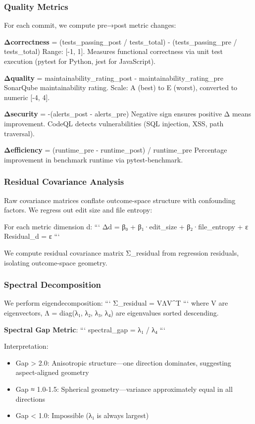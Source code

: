 \subsubsection{Quality Metrics}

For each commit, we compute pre→post metric changes:

\textbf{Δcorrectness} = (tests_passing_post / tests_total) - (tests_passing_pre / tests_total)  
Range: [-1, 1]. Measures functional correctness via unit test execution (pytest for Python, jest for JavaScript).

\textbf{Δquality} = maintainability_rating_post - maintainability_rating_pre  
SonarQube maintainability rating. Scale: A (best) to E (worst), converted to numeric [-4, 4].

\textbf{Δsecurity} = -(alerts_post - alerts_pre)  
Negative sign ensures positive Δ means improvement. CodeQL detects vulnerabilities (SQL injection, XSS, path traversal).

\textbf{Δefficiency} = (runtime_pre - runtime_post) / runtime_pre  
Percentage improvement in benchmark runtime via pytest-benchmark.

\subsubsection{Residual Covariance Analysis}

Raw covariance matrices conflate outcome-space structure with confounding factors. We regress out edit size and file entropy:

For each metric dimension d:
```
Δd = β₀ + β₁·edit_size + β₂·file_entropy + ε
Residual_d = ε
```

We compute residual covariance matrix Σ_residual from regression residuals, isolating outcome-space geometry.

\subsubsection{Spectral Decomposition}

We perform eigendecomposition:
```
Σ_residual = VΛV^T
```
where V are eigenvectors, Λ = diag(λ₁, λ₂, λ₃, λ₄) are eigenvalues sorted descending.

\textbf{Spectral Gap Metric}:
```
spectral_gap = λ₁ / λ₄
```

Interpretation:
\begin{itemize}
\item Gap > 2.0: Anisotropic structure—one direction dominates, suggesting aspect-aligned geometry
\item Gap ≈ 1.0-1.5: Spherical geometry—variance approximately equal in all directions
\item Gap < 1.0: Impossible (λ₁ is always largest)
\end{itemize}

